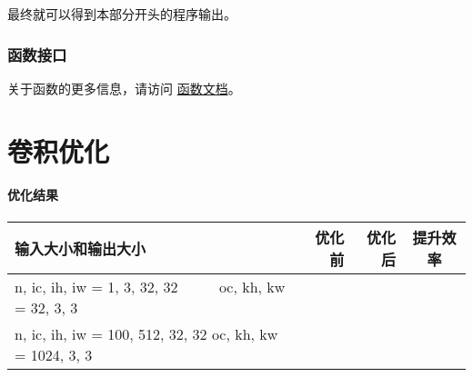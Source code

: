 \documentclass[UTF8]{ctexart}
\begin{document}
最终就可以得到本部分开头的程序输出。

\section{函数接口}


关于函数的更多信息，请访问 \href{run:../opg/target/doc/opg/index.html}{函数文档}。

\part{卷积优化}
\subsection*{优化结果}
\begin{table}[H]
    \begin{tabular}{m{17em}rrc}
        \toprule
        输入大小和输出大小 & 优化前 & 优化后 & 提升效率 \\
        \midrule
        \ttfamily
        n, ic, ih, iw = 1, 3, 32, 32~~~~~
        oc, kh, kw = 32, 3, 3
        & & & \\
        \hline
        \ttfamily
        n, ic, ih, iw = 100, 512, 32, 32
        oc, kh, kw = 1024, 3, 3
        & & & \\
        \bottomrule
    \end{tabular}
\end{table}


\end{document}
